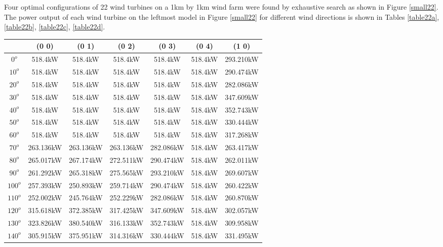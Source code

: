         Four optimal configurations of 22 wind turbines on a 1km by 1km wind farm were found by exhaustive search as shown in Figure \ref{small22}. The power output of each wind turbine on the leftmost model in Figure \ref{small22} for different wind directions is shown in Tables \ref{table22a}, \ref{table22b}, \ref{table22c}, \ref{table22d}.
        
        \singlespacing
        \begin{table}[H]
        	\centering
        	\begin{tabular}{|c|c|c|c|c|c|c|} \hline
        			& (0 0)		& (0 1)		& (0 2)		& (0 3)		& (0 4)		& (1 0)		\\ \hline
		$0^o$	& 518.4kW	& 518.4kW	& 518.4kW	& 518.4kW	& 518.4kW	& 293.210kW	\\ \hline
		$10^o$	& 518.4kW	& 518.4kW	& 518.4kW	& 518.4kW	& 518.4kW	& 290.474kW	\\ \hline
		$20^o$	& 518.4kW	& 518.4kW	& 518.4kW	& 518.4kW	& 518.4kW	& 282.086kW	\\ \hline
		$30^o$	& 518.4kW	& 518.4kW	& 518.4kW	& 518.4kW	& 518.4kW	& 347.609kW	\\ \hline
		$40^o$	& 518.4kW	& 518.4kW	& 518.4kW	& 518.4kW	& 518.4kW	& 352.743kW	\\ \hline
		$50^o$	& 518.4kW	& 518.4kW	& 518.4kW	& 518.4kW	& 518.4kW	& 330.444kW	\\ \hline
		$60^o$	& 518.4kW	& 518.4kW	& 518.4kW	& 518.4kW	& 518.4kW	& 317.268kW	\\ \hline
		$70^o$	& 263.136kW	& 263.136kW	& 263.136kW	& 282.086kW	& 518.4kW	& 263.417kW	\\ \hline
		$80^o$	& 265.017kW	& 267.174kW	& 272.511kW	& 290.474kW	& 518.4kW	& 262.011kW	\\ \hline
		$90^o$	& 261.292kW	& 265.318kW	& 275.565kW	& 293.210kW	& 518.4kW	& 269.607kW	\\ \hline
		$100^o$	& 257.393kW	& 250.893kW	& 259.714kW	& 290.474kW	& 518.4kW	& 260.422kW	\\ \hline
		$110^o$	& 252.002kW	& 245.764kW	& 252.229kW	& 282.086kW	& 518.4kW	& 260.870kW	\\ \hline
		$120^o$	& 315.618kW	& 372.385kW	& 317.425kW	& 347.609kW	& 518.4kW	& 302.057kW	\\ \hline
		$130^o$	& 323.826kW	& 380.540kW	& 316.133kW	& 352.743kW	& 518.4kW	& 309.958kW	\\ \hline
		$140^o$	& 305.915kW	& 375.951kW	& 314.316kW	& 330.444kW	& 518.4kW	& 331.495kW	\\ \hline

\end{tabular}
\end{table}
